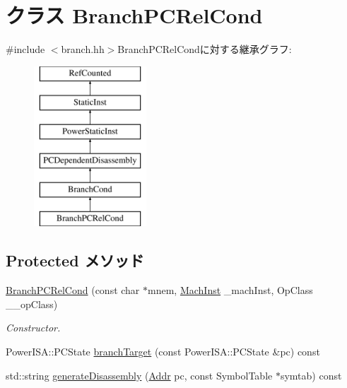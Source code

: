 \hypertarget{classPowerISA_1_1BranchPCRelCond}{
\section{クラス BranchPCRelCond}
\label{classPowerISA_1_1BranchPCRelCond}
}


{\ttfamily \#include $<$branch.hh$>$}BranchPCRelCondに対する継承グラフ:\begin{figure}[H]
\begin{center}
\leavevmode
\includegraphics[height=6cm]{classPowerISA_1_1BranchPCRelCond}
\end{center}
\end{figure}
\subsection*{Protected メソッド}
\begin{DoxyCompactItemize}
\item 
\hyperlink{classPowerISA_1_1BranchPCRelCond_ae2724f428c54f73fe949436577878bb2}{BranchPCRelCond} (const char $\ast$mnem, \hyperlink{namespacePowerISA_a301c22ea09fa33dcfe6ddf22f203699c}{MachInst} \_\-machInst, OpClass \_\-\_\-opClass)
\begin{DoxyCompactList}\small\item\em Constructor. \item\end{DoxyCompactList}\item 
PowerISA::PCState \hyperlink{classPowerISA_1_1BranchPCRelCond_a860401b0a6432ac5dbe246c64448d56d}{branchTarget} (const PowerISA::PCState \&pc) const 
\item 
std::string \hyperlink{classPowerISA_1_1BranchPCRelCond_a95d323a22a5f07e14d6b4c9385a91896}{generateDisassembly} (\hyperlink{base_2types_8hh_af1bb03d6a4ee096394a6749f0a169232}{Addr} pc, const SymbolTable $\ast$symtab) const 
\end{DoxyCompactItemize}
